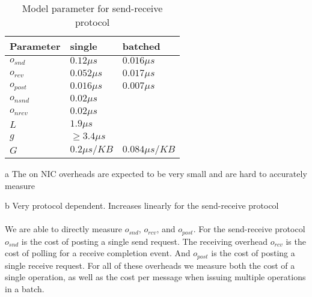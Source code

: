 \begin{table}[!ht]
\setlength\tabcolsep{1.5pt}
\centering
\caption{Model parameter for send-receive protocol}
\label{tab:model}
\begin{threeparttable}[t]
 \begin{tabular}{|x{3.5cm}|x{3.5cm}|x{3.5cm}|} %
 \hline
 Parameter    &  single & batched \\
  \hline
  \hline
 $o_{snd}$    & $0.12 \mu s$ &  $0.016 \mu s$\\
  \hline
 $o_{rcv}$    & $0.052 \mu s$ & $0.017 \mu s$\\
  \hline
 $o_{post}$   & $0.016 \mu s$ & $0.007 \mu s$\\
  \hline
 $o_{nsnd}$   & $0.02 \mu s$ &   \\
  \hline
 $o_{nrcv}$   & $0.02 \mu s$ &   \\
  \hline
 $L$          & $1.9 \mu s$ &  \\
  \hline
 $g$          & $\geq 3.4 \mu s$  & \\
 \hline
 $G$          & $0.2\mu s / KB$  & $0.084\mu s / KB$\\

\hline
\end{tabular}
\begin{tablenotes}
\item[a] \small The on NIC overheads are expected to be very small and are hard to accurately measure
\item[b] \small Very protocol dependent. Increases linearly for the send-receive protocol
\end{tablenotes}
\end{threeparttable}
\end{table}


\paragraph{} We are able to directly measure $o_{snd}$, $o_{rcv}$, and $o_{post}$. For the send-receive protocol $o_{snd}$ is the cost of 
posting a single send request. The receiving overhead $o_{rcv}$ is the cost of polling for a receive completion event. And
$o_{post}$ is the cost of posting a single receive request. For all of these overheads we measure both the cost of a single
operation, as well as the cost per message when issuing multiple operations in a batch.


